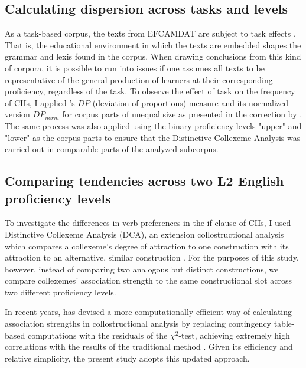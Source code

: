 \subsection{Calculating dispersion across tasks and levels}

As a task-based corpus, the texts from EFCAMDAT are subject to task effects \citep{alexopoulouTaskEffect2017}. That is, the educational environment in which the texts are embedded shapes the grammar and lexis found in the corpus.
When drawing conclusions from this kind of corpora, it is possible to run into issues if one assumes all texts to be representative of the general production of learners at their corresponding proficiency, regardless of the task.  
To observe the effect of task on the frequency of CIIs, I applied \citeauthor{griesDispersionsAdjustedFrequencies2008}'s \citeyearpar{griesDispersionsAdjustedFrequencies2008} $DP$ (deviation of proportions) measure and its normalized version $DP_{norm}$ for corpus parts of unequal size as presented in the correction by \cite{lijffijt_gries_correction}.
The same process was also applied using the binary proficiency levels "upper" and "lower" as the corpus parts to ensure that the Distinctive Collexeme Analysis was carried out in comparable parts of the analyzed subcorpus.

\subsection{Comparing tendencies across two L2 English proficiency levels}

To investigate the differences in verb preferences in the if-clause of CIIs, I used  Distinctive Collexeme Analysis (DCA), 
an extension collostructional analysis which compares a collexeme's degree of attraction to one construction with its attraction to an alternative, similar construction \citep{griesExtendingCollostructionalAnalysis2004}.
For the purposes of this study, however, instead of comparing two analogous but distinct constructions, we compare collexemes' association strength to the same constructional slot across two different proficiency levels.

In recent years, \citeauthor{griesOverhaulingCollostructionalAnalysis2023} has devised a more computationally-efficient way of calculating association strengths in collostructional analysis by replacing contingency table-based computations with the residuals of the $\chi^2$-test, achieving extremely high correlations with the results of the traditional method \citep{griesOverhaulingCollostructionalAnalysis2023}.
Given its efficiency and relative simplicity, the present study adopts this updated approach.

